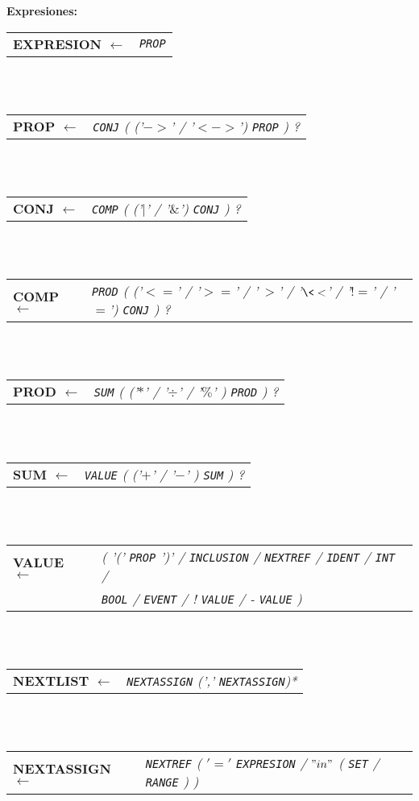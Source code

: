 \documentclass[titlepage, 12pt]{book}
\begin{document}
\textbf{Expresiones:}\\

\noindent \begin{tabular}{>{\bfseries}l>{\itshape}l}
EXPRESION $\longleftarrow$ & \verb|PROP|
\end{tabular}
~\\\\
\begin{tabular}{>{\bfseries}l>{\itshape}l}
PROP $\longleftarrow$ & \verb|CONJ| ( ('$->$' / '$<->$') \verb|PROP| ) ?
\end{tabular}
~\\\\
\begin{tabular}{>{\bfseries}l>{\itshape}l}
CONJ $\longleftarrow$ & \verb|COMP| ( ('$|$' / '$\&$') \verb|CONJ| ) ?
\end{tabular}
~\\\\
\begin{tabular}{>{\bfseries}l>{\itshape}l}
COMP $\longleftarrow$ & \verb|PROD| ( ('$<=$' / '$>=$' / '$\>>$' / '$\<<$' / '$!=$' / '$=$') \verb|CONJ| ) ?
\end{tabular}
~\\\\
\begin{tabular}{>{\bfseries}l>{\itshape}l}
PROD $\longleftarrow$ & \verb|SUM| ( ('$*$' / '$\div$' / '$\%$' ) \verb|PROD| ) ?
\end{tabular}
~\\\\
\begin{tabular}{>{\bfseries}l>{\itshape}l}
SUM $\longleftarrow$ & \verb|VALUE| ( ('$+$' / '$-$' ) \verb|SUM| ) ?
\end{tabular}
~\\\\
\begin{tabular}{>{\bfseries}l>{\itshape}l}
VALUE $\longleftarrow$  & ( '(' \verb|PROP| ')' / \verb|INCLUSION| / \verb|NEXTREF| / \verb|IDENT| / \verb|INT| /\\
						&  \verb|BOOL| / \verb|EVENT| / ! \verb|VALUE| / - \verb|VALUE| ) \\
\end{tabular}
~\\\\
\begin{tabular}{>{\bfseries}l>{\itshape}l}
NEXTLIST $\longleftarrow$  & \verb|NEXTASSIGN| (',' \verb|NEXTASSIGN|)*
\end{tabular}
~\\\\
\begin{tabular}{>{\bfseries}l>{\itshape}l}
NEXTASSIGN $\longleftarrow$  & \verb|NEXTREF| ( $'='$ \verb|EXPRESION| / $"in"$ ( \verb|SET| / \verb|RANGE| ) )
\end{tabular}
~\\\\
\end{document}

